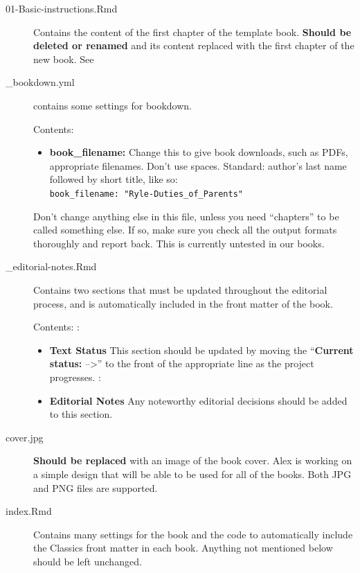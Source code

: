 \documentclass[
  english,
]{book}
\providecommand{\tightlist}{%
  \setlength{\itemsep}{0pt}\setlength{\parskip}{0pt}}
\begin{document}
\begin{description}
\item[01-Basic-instructions.Rmd]
Contains the content of the first chapter of the template book. \textbf{Should be deleted or renamed} and its content replaced with the first chapter of the new book. See
\item[\_bookdown.yml]
contains some settings for bookdown.

Contents:

\begin{itemize}
\tightlist
\item
  \textbf{book\_filename:} Change this to give book downloads, such as PDFs, appropriate filenames. Don't use spaces. Standard: author's last name followed by short title, like so:\\
  \texttt{book\_filename:\ "Ryle-Duties\_of\_Parents"}
\end{itemize}

Don't change anything else in this file, unless you need ``chapters'' to be called something else. If so, make sure you check all the output formats thoroughly and report back. This is currently untested in our books.
\item[\_editorial-notes.Rmd]
Contains two sections that must be updated throughout the editorial process, and is automatically included in the front matter of the book.

Contents:
:

\begin{itemize}
\tightlist
\item
  \textbf{Text Status} This section should be updated by moving the ``\textbf{Current status:} --\textgreater{}'' to the front of the appropriate line as the project progresses.
  :
\end{itemize}

\begin{itemize}
\tightlist
\item
  \textbf{Editorial Notes} Any noteworthy editorial decisions should be added to this section.
\end{itemize}
\item[cover.jpg]
\textbf{Should be replaced} with an image of the book cover. Alex is working on a simple design that will be able to be used for all of the books. Both JPG and PNG files are supported.
\item[index.Rmd]
Contains many settings for the book and the code to automatically include the Classics front matter in each book. Anything not mentioned below should be left unchanged.


\end{description}
\end{document}
